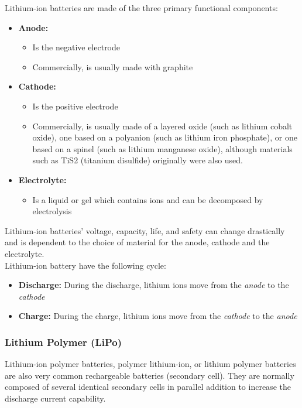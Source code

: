 \documentclass[report.tex]{subfiles}
\begin{document}
Lithium-ion batteries are made of the three primary functional components:
\begin{itemize}
\item \textbf{Anode:}
	\begin{itemize}
		\item Is the negative electrode
		\item Commercially, is usually made with graphite
	\end{itemize}
\item \textbf{Cathode:} 
	\begin{itemize}
		\item Is the positive electrode
		\item Commercially, is usually made of a layered oxide (such as lithium cobalt oxide), one based on a 					polyanion (such as lithium iron phosphate), or one based on a spinel (such as lithium manganese oxide), 					although materials such as TiS2 (titanium disulfide) originally were also used.
	\end{itemize}
\item \textbf{Electrolyte:} 
	\begin{itemize}
		\item Is a liquid or gel which contains ions and can be decomposed by electrolysis\\
	\end{itemize}
\end{itemize}

Lithium-ion batteries' voltage, capacity, life, and safety can change drastically and is dependent to the choice of material for the anode, cathode and the electrolyte.\\

Lithium-ion battery have the following cycle:
\begin{itemize}
\item \textbf{Discharge:} During the discharge, lithium ions move from the \textit{anode} to the \textit{cathode}
\item \textbf{Charge:} During the charge, lithium ions move from the \textit{cathode} to the \textit{anode}
\end{itemize}

\subsubsection{Lithium Polymer (LiPo)\cite{litBatTech}}

Lithium-ion polymer batteries, polymer lithium-ion, or lithium polymer batteries are also very common rechargeable batteries (secondary cell). They are normally composed of several identical secondary cells in parallel addition to increase the discharge current capability.
\end{document}
